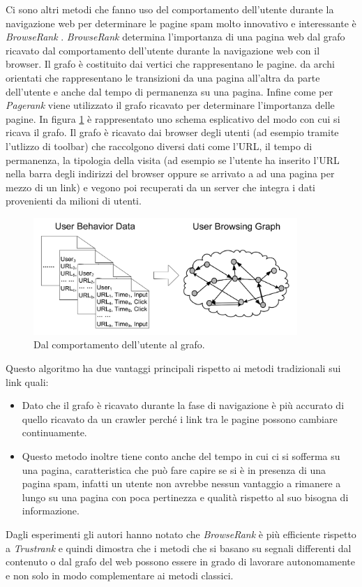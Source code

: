 Ci sono altri metodi che fanno uso del comportamento dell'utente durante la navigazione web per determinare le pagine spam molto innovativo e interessante è \textit{BrowseRank} \cite{Liu:2008:BLW:1390334.1390412}. \textit{BrowseRank} determina l'importanza di una pagina web dal grafo ricavato dal comportamento dell'utente durante la navigazione web con il browser. Il grafo è costituito dai vertici che rappresentano le pagine. da archi orientati che rappresentano le transizioni da una pagina all'altra da parte dell'utente e anche dal tempo di permanenza su una pagina. Infine come per \textit{Pagerank} viene utilizzato il grafo ricavato per determinare l'importanza delle pagine. In figura \ref{img:browser} è rappresentato uno schema esplicativo del modo con cui si ricava il grafo. Il grafo è ricavato dai browser degli utenti (ad esempio tramite l'utlizzo di toolbar) che raccolgono diversi dati come l'URL, il tempo di permanenza, la tipologia della visita (ad esempio se l'utente ha inserito l'URL nella barra degli indirizzi del browser oppure se arrivato a ad una pagina per mezzo di un link) e vegono poi recuperati da un server che integra i dati provenienti da milioni di utenti.
\begin{figure}
\centering
\includegraphics[width=10cm]{immagini/altre/browser.png}
\caption{Dal comportamento dell'utente al grafo.}
\label{img:browser}
\end{figure}
Questo algoritmo ha due vantaggi principali rispetto ai metodi tradizionali sui link quali:
\begin{itemize}
 \item Dato che il grafo è ricavato durante la fase di navigazione è più accurato di quello ricavato da un crawler perché i link tra le pagine possono cambiare continuamente.
 \item Questo metodo inoltre tiene conto anche del tempo in cui ci si sofferma su una pagina, caratteristica che può fare capire se si è in presenza di una pagina spam, infatti un utente non avrebbe nessun vantaggio a rimanere a lungo su una pagina con poca pertinezza e qualità rispetto al suo bisogna di informazione.
\end{itemize}
Dagli esperimenti gli autori hanno notato che \textit{BrowseRank} è più efficiente rispetto a \textit{Trustrank} e quindi dimostra che i metodi che si basano su segnali differenti dal contenuto o dal grafo del web possono essere in grado di lavorare autonomamente e non solo in modo  complementare ai metodi classici.

